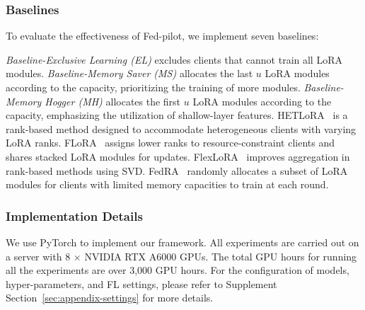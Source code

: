 \documentclass[sigconf]{acmart}
\begin{document}
\subsubsection{Baselines}
To evaluate the effectiveness of Fed-pilot, we implement seven baselines:

\textit{Baseline-Exclusive Learning (EL)} excludes clients that cannot train all LoRA modules. 
%
\textit{Baseline-Memory Saver (MS)} allocates the last $u$ LoRA modules according to the capacity, prioritizing the training of more modules.
%
\textit{Baseline-Memory Hogger (MH)} allocates the first $u$ LoRA modules according to the capacity,
emphasizing the utilization of shallow-layer features.
%
{HETLoRA}~\cite{cho2024heterogeneous} is a rank-based method designed to accommodate heterogeneous clients with varying LoRA ranks.
%
{FLoRA}~\cite{wangflora} assigns lower ranks to resource-constraint clients and shares stacked LoRA modules for updates.
%
{FlexLoRA}~\cite{bai2024federated} improves aggregation in rank-based methods using SVD.
%
{FedRA}~\cite{su2023fedra} 
randomly allocates a subset of LoRA modules for clients with limited memory capacities to train at each round. 

\subsubsection{Implementation Details}
We use PyTorch to implement our framework. All experiments are carried out on a server with 8 $\times$ NVIDIA RTX A6000 GPUs. The total GPU hours for running all the experiments are over 3,000 GPU hours. For the configuration of models,  hyper-parameters, and FL settings, 
please refer to {{Supplement Section~\ref{sec:appendix-settings}}} for more details.

\end{document}
